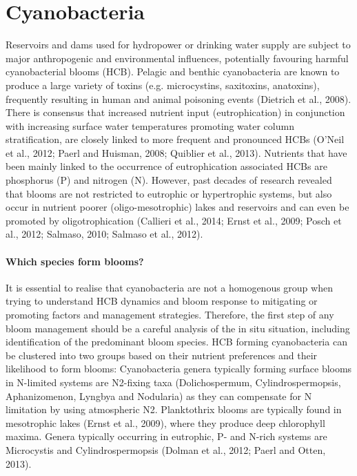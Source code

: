 \section{Cyanobacteria}
\label{sec:1}
Reservoirs and dams used for hydropower or drinking water supply are subject to major anthropogenic and environmental influences, potentially favouring harmful cyanobacterial blooms (HCB). Pelagic and benthic cyanobacteria are known to produce a large variety of toxins (e.g. microcystins, saxitoxins, anatoxins), frequently resulting in human and animal poisoning events (Dietrich et al., 2008). There is consensus that increased nutrient input (eutrophication) in conjunction with increasing surface water temperatures promoting water column stratification, are closely linked to more frequent and pronounced HCBs (O’Neil et al., 2012; Paerl and Huisman, 2008; Quiblier et al., 2013). Nutrients that have been mainly linked to the occurrence of eutrophication associated HCBs are phosphorus (P) and nitrogen (N). However, past decades of research revealed that blooms are not restricted to eutrophic or hypertrophic systems, but also occur in nutrient poorer (oligo-mesotrophic) lakes and reservoirs and can even be promoted by oligotrophication (Callieri et al., 2014; Ernst et al., 2009; Posch et al., 2012; Salmaso, 2010; Salmaso et al., 2012).
\paragraph {Which species form blooms?}
It is essential to realise that cyanobacteria are not a homogenous group when trying to understand HCB dynamics and bloom response to mitigating or promoting factors and management strategies. Therefore, the first step of any bloom management should be a careful analysis of the in situ situation, including identification of the predominant bloom species. HCB forming cyanobacteria can be clustered into two groups based on their nutrient preferences and their likelihood to form blooms: Cyanobacteria genera typically forming surface blooms in N-limited systems are N2-fixing taxa (Dolichospermum, Cylindrospermopsis, Aphanizomenon, Lyngbya and Nodularia) as they can compensate for N limitation by using atmospheric N2. Planktothrix blooms are typically found in mesotrophic lakes (Ernst et al., 2009), where they produce deep chlorophyll maxima. Genera typically occurring in eutrophic, P- and N-rich systems are Microcystis and Cylindrospermopsis (Dolman et al., 2012; Paerl and Otten, 2013).
